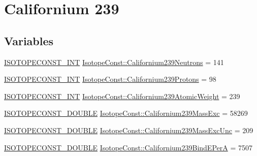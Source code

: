 \hypertarget{group___isotope_const-_californium-_cf239}{}\section{Californium 239}
\label{group___isotope_const-_californium-_cf239}
\subsection*{Variables}
\begin{DoxyCompactItemize}
\item 
\mbox{\hyperlink{group___isotope_const-_macros_ga5f18360b3e99483a35c32d789e62621c}{I\+S\+O\+T\+O\+P\+E\+C\+O\+N\+S\+T\+\_\+\+I\+NT}} \mbox{\hyperlink{group___isotope_const-_californium-_cf239_ga2d306b036f8483e5d5cc6e6cc9f061ca}{Isotope\+Const\+::\+Californium239\+Neutrons}} = 141
\item 
\mbox{\hyperlink{group___isotope_const-_macros_ga5f18360b3e99483a35c32d789e62621c}{I\+S\+O\+T\+O\+P\+E\+C\+O\+N\+S\+T\+\_\+\+I\+NT}} \mbox{\hyperlink{group___isotope_const-_californium-_cf239_ga059a9fc363a471f474cc8db4d61bd67f}{Isotope\+Const\+::\+Californium239\+Protons}} = 98
\item 
\mbox{\hyperlink{group___isotope_const-_macros_ga5f18360b3e99483a35c32d789e62621c}{I\+S\+O\+T\+O\+P\+E\+C\+O\+N\+S\+T\+\_\+\+I\+NT}} \mbox{\hyperlink{group___isotope_const-_californium-_cf239_gac0a39e7db92bb8db2deeab00dfe89bd0}{Isotope\+Const\+::\+Californium239\+Atomic\+Weight}} = 239
\item 
\mbox{\hyperlink{group___isotope_const-_macros_ga8f45a7272ce02c0b4c65c44636ed719a}{I\+S\+O\+T\+O\+P\+E\+C\+O\+N\+S\+T\+\_\+\+D\+O\+U\+B\+LE}} \mbox{\hyperlink{group___isotope_const-_californium-_cf239_gaddeefaafd117a269e3f37818af322c58}{Isotope\+Const\+::\+Californium239\+Mass\+Exc}} = 58269
\item 
\mbox{\hyperlink{group___isotope_const-_macros_ga8f45a7272ce02c0b4c65c44636ed719a}{I\+S\+O\+T\+O\+P\+E\+C\+O\+N\+S\+T\+\_\+\+D\+O\+U\+B\+LE}} \mbox{\hyperlink{group___isotope_const-_californium-_cf239_gaeea159a6b02742ee8e03e2f565847a09}{Isotope\+Const\+::\+Californium239\+Mass\+Exc\+Unc}} = 209
\item 
\mbox{\hyperlink{group___isotope_const-_macros_ga8f45a7272ce02c0b4c65c44636ed719a}{I\+S\+O\+T\+O\+P\+E\+C\+O\+N\+S\+T\+\_\+\+D\+O\+U\+B\+LE}} \mbox{\hyperlink{group___isotope_const-_californium-_cf239_gad254af68a318be4d65067f7e43bc9b1d}{Isotope\+Const\+::\+Californium239\+Bind\+E\+PerA}} = 7507
\item 

\end{DoxyCompactItemize}
